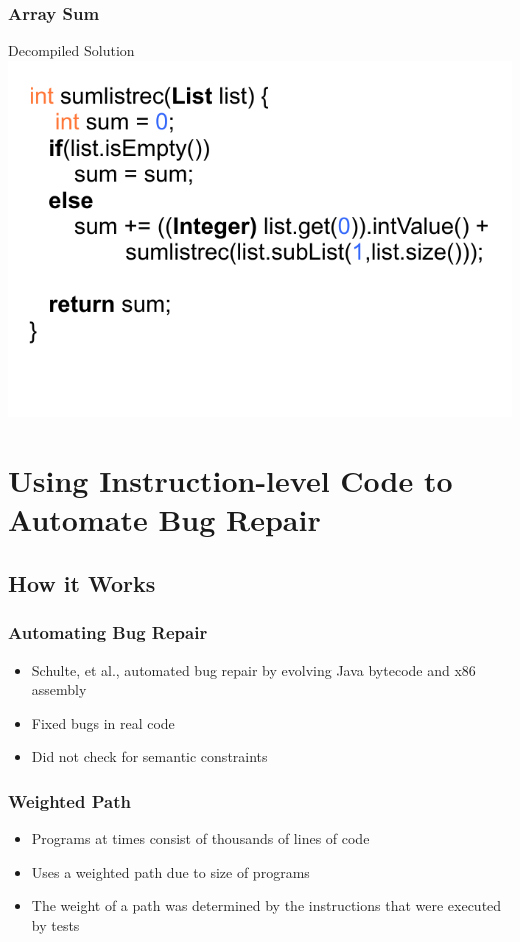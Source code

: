 \documentclass{beamer}
\begin{document}
\begin{frame}
\frametitle{Array Sum}
\begin{center}
Decompiled Solution
\\
\includegraphics[height=.9\textheight]{Illustrations/solutionRec.pdf}
\end{center}


\end{frame}


\section[Evolving Assembly]{Using Instruction-level Code to Automate Bug Repair}

\subsection{How it Works}
\begin{frame}
  \frametitle{Automating Bug Repair}
  \begin{itemize}
  \item Schulte, et al., automated bug repair by evolving Java bytecode and x86 assembly
  \item Fixed bugs in real code
  \item Did not check for semantic constraints 
  \end{itemize}
\end{frame}

\begin{frame}
\frametitle{Weighted Path}
\begin{itemize}

   \item Programs at times consist of thousands of lines of code  
   \item Uses a weighted path due to size of programs
   \item The weight of a path was determined by the instructions that were executed by tests

   \end{itemize}
\end{frame}
\end{document}
